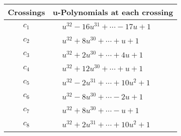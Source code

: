\documentclass[1p]{elsarticle_modified}
\theoremstyle{definition}
\begin{document}
\begin{tabular}{m{50pt}|m{274pt}}
Crossings & \hspace{64pt}u-Polynomials at each crossing \\
\hline $$\begin{aligned}c_{1}\end{aligned}$$&$\begin{aligned}
&u^{32}-16 u^{31}+\cdots-17 u+1
\end{aligned}$\\
\hline $$\begin{aligned}c_{2}\end{aligned}$$&$\begin{aligned}
&u^{32}+8 u^{30}+\cdots+u+1
\end{aligned}$\\
\hline $$\begin{aligned}c_{3}\end{aligned}$$&$\begin{aligned}
&u^{32}+2 u^{30}+\cdots+4 u+1
\end{aligned}$\\
\hline $$\begin{aligned}c_{4}\end{aligned}$$&$\begin{aligned}
&u^{32}+12 u^{30}+\cdots+u+1
\end{aligned}$\\
\hline $$\begin{aligned}c_{5}\end{aligned}$$&$\begin{aligned}
&u^{32}-2 u^{31}+\cdots+10 u^2+1
\end{aligned}$\\
\hline $$\begin{aligned}c_{6}\end{aligned}$$&$\begin{aligned}
&u^{32}-8 u^{30}+\cdots-2 u+1
\end{aligned}$\\
\hline $$\begin{aligned}c_{7}\end{aligned}$$&$\begin{aligned}
&u^{32}+8 u^{30}+\cdots- u+1
\end{aligned}$\\
\hline $$\begin{aligned}c_{8}\end{aligned}$$&$\begin{aligned}
&u^{32}+2 u^{31}+\cdots+10 u^2+1
\end{aligned}$\\

\end{tabular}
\end{document}
